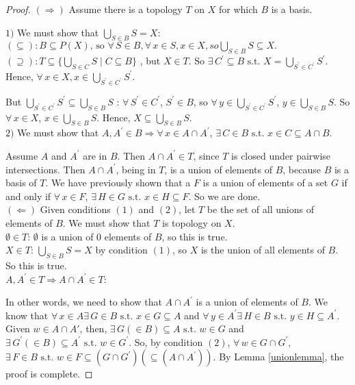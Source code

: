 \documentclass[12pt]{report}
\newcommand{\fall}{\forall\,}
\newcommand{\exst}{\exists\,}
\newcommand{\st}{\textrm{ s.t. }}
\newcommand{\unionover}[2]{\bigcup_{#1 \in #2 }}
\begin{document}
\begin{proof}
\noindent
$(\Rightarrow)$ Assume there is a topology $T$ on $X$ for which $B$ is a
basis.

$1)$ We must show that $\unionover{S}{B}S = X$:
\\[2pt]

\noindent
$(\subseteq): B \subseteq P(X) \textrm{, so } \fall S \in B, \fall x \in S, 
x \in X, so \unionover{S}{B} S \subseteq X.$
\\[2pt]

\noindent
$(\supseteq): T \subseteq \{\unionover{S}{C} S\mid C \subseteq B\}$ ,
but $ X \in T \textrm{. So } \exst C^{\prime} \subseteq B \st X =
\unionover{S^{\prime}}{C^{\prime}}S^{\prime}$. Hence, $ \fall x \in X,
x \in \unionover{S^{\prime}}{C^{\prime}}S^{\prime}$.

But $ \unionover{S^{\prime}}{C^{\prime}}S^{\prime} \subseteq \unionover{S}{B}S$
: $\fall S^{\prime} \in C^{\prime}$, $S^{\prime} \in B$, so 
$\fall y \in \unionover{S^{\prime}}{C^{\prime}}S^{\prime}$, $y \in 
\unionover{S}{B}S$. So $\fall x \in X$, $x \in \unionover{S}{B}S$. Hence, 
$X \subseteq \unionover{S}{B}S.$\\[2pt]

$2)$ We must show that $A,A^\prime \in B \Rightarrow \fall x \in A \cap
A^\prime$, 
$\exst C \in B \st x \in C \subseteq A \cap B$.

Assume $A$ and $A^\prime$ are in $B$. Then $A \cap A^\prime \in T$, since $T$ is closed
under pairwise intersections.  Then $A \cap A^\prime$, being in $T$, is a union of
elements of $B$, because $B$ is a basis of $T$. We have previously shown that
a $F$ is a union of elements of a set $G$ if and only if $\fall x \in F$, 
$\exst H \in G \st x \in H \subseteq F$. So we are done.
\\[2pt]

\noindent
$(\Leftarrow)$ Given conditions $(1)$ and $(2)$, let $T$ be the set of all
unions of elements of $B$. We must show that $T$ is topology on $X$. 
\\[1pt]

\noindent
$\emptyset \in T$: $\emptyset$ is a union of 0 elements of $B$, 
so this is true.
\\[1pt]

\noindent
$X \in T$: $\unionover{S}{B}S = X$ by condition $(1)$, so $X$ is the union of
all elements of $B$. So this is true.
\\

\noindent
$A,A^\prime \in T \Rightarrow A \cap A^\prime \in T$:

In other words, we need to show that $A \cap A^\prime$ is a union of elements of $B$. We know that 
$\fall x \in A \exst G \in B \st x \in G \subseteq A$ and 
$\fall y \in A^\prime \exst H \in B \st y \in H \subseteq A^\prime$. Given 
$w \in A \cap A\prime $, then, $\exst G (\in B) \subseteq A \st w \in G$ and 
$\exst G^\prime (\in B) \subseteq A^\prime \st w \in G^\prime$. So, by
condition $(2)$, $\fall w \in G \cap G^\prime$, $\exst F \in B \st w \in F
\subseteq (G \cap G^\prime) (\subseteq (A \cap A^\prime)) $. By
Lemma \ref{unionlemma}, the proof is complete.
\end{proof}
\end{document}
